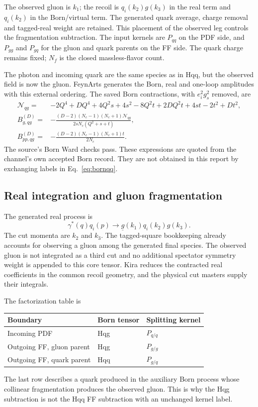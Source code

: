 \documentclass[11pt,a4paper]{article}
\newcommand{\obs}[1]{\underline{#1}}
\begin{document}
The observed gluon is $k_1$; the recoil is $q_i(k_2)g(k_3)$ in the real
term and $q_i(k_2)$ in the Born/virtual term. The generated quark average,
charge removal and tagged-real weight are retained. This placement of the
observed leg controls the fragmentation subtraction.
The input kernels are $P_{qq}$ on the PDF side, and $P_{gg}$ and $P_{gq}$
for the gluon and quark parents on the FF side.
The quark charge remains fixed; $N_f$ is the closed massless-flavor count.

The photon and incoming quark are the same species as in Hqq, but the
observed field is now the gluon. FeynArts generates the Born, real and
one-loop amplitudes with this external ordering. The saved Born
contractions, with $e_i^2g_s^2$ removed, are
\begin{align}
 \mathcal N_{qg}={}&-2Q^4+DQ^4+4Q^2s+4s^2-8Q^2t
                  +2DQ^2t+4st-2t^2+Dt^2,\\
 B_{g,qg}^{(D)}={}&-
 \frac{(D-2)(N_c-1)(N_c+1)\mathcal N_{qg}}
 {2sN_c(Q^2+s+t)},\\
 B_{pp,qg}^{(D)}={}&-
 \frac{(D-2)(N_c-1)(N_c+1)t}{2N_c}.
 \label{eq:bornqg}
\end{align}
The source's Born Ward checks pass. These expressions are quoted from
the channel's own accepted Born record. They are not obtained in this
report by exchanging labels in Eq.~\eqref{eq:bornqq}.

\subsection{Real integration and gluon fragmentation}

The generated real process is
\begin{equation}
 \gamma^*(q)q_i(p)\to\obs{g}(k_1)q_i(k_2)g(k_3).
\end{equation}
The cut momenta are $k_2$ and $k_3$. The tagged-square bookkeeping
already accounts for observing a gluon among the generated final
species. The observed gluon is not integrated as a third cut and no
additional spectator symmetry weight is appended to this core tensor.
Kira reduces the contracted real coefficients in the common recoil
geometry, and the physical cut masters supply their integrals.

The factorization table is
\begin{center}
\begin{tabular}{@{}lll@{}}
\toprule
Boundary & Born tensor & Splitting kernel\\
\midrule
Incoming PDF & Hqg & $P_{q/q}$\\
Outgoing FF, gluon parent & Hqg & $P_{g/g}$\\
Outgoing FF, quark parent & Hqq & $P_{g/q}$\\
\bottomrule
\end{tabular}
\end{center}
The last row describes a quark produced in the auxiliary Born process
whose collinear fragmentation produces the observed gluon. This is why
the Hqg subtraction is not the Hqq FF subtraction with an unchanged
kernel label.
\end{document}

